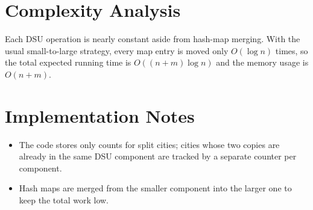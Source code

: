 \documentclass[11pt]{article}
\begin{document}
\section*{Complexity Analysis}

Each DSU operation is nearly constant aside from hash-map merging. With the usual small-to-large
strategy, every map entry is moved only $O(\log n)$ times, so the total expected running time is
$O((n+m)\log n)$ and the memory usage is $O(n+m)$.

\section*{Implementation Notes}

\begin{itemize}[leftmargin=*]
    \item The code stores only counts for split cities; cities whose two copies are already in the same DSU
    component are tracked by a separate counter per component.
    \item Hash maps are merged from the smaller component into the larger one to keep the total work low.
\end{itemize}
\end{document}
